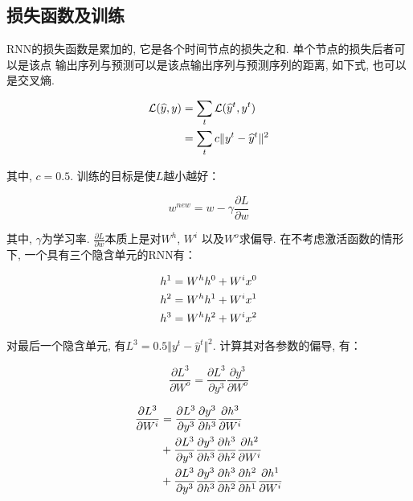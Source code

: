 \documentclass[UTF8, twocolumn]{ctexart}
\begin{document}
\subsection{损失函数及训练}
RNN的损失函数是累加的, 它是各个时间节点的损失之和. 单个节点的损失后者可以是该点
输出序列与预测可以是该点输出序列与预测序列的距离, 如下式, 也可以是交叉熵. 


\begin{align}
\mathcal{L}(\widehat{y},y)\notag &= \sum_t \mathcal{L}(\widehat{y}^t, y^t)\\
                                  &= \sum_t c \Vert y^t - \widehat{y}^t \Vert^2
\end{align}


其中, $c=0.5$. 训练的目标是使$L$越小越好：

\begin{equation}
w^{new} = w - \gamma \frac{\partial L}{\partial w}
\end{equation}

其中, $\gamma$为学习率. $\frac{\partial L}{\partial w}$本质上是对$W^h$, $W^i$
以及$W^o$求偏导. 在不考虑激活函数的情形下, 一个具有三个隐含单元的RNN有：

\begin{align}
h^1 = W^h h^0 + W^i x^0\notag \\
h^2 = W^h h^1 + W^i x^1\notag \\
h^3 = W^h h^2 + W^i x^2
\end{align}


对最后一个隐含单元, 有$L^3 = 0.5 \Vert y^t - \widehat{y}^t \Vert^2$. 
计算其对各参数的偏导, 有：

\begin{equation}
\frac{\partial L^3}{\partial W^o} = \frac{\partial L^3}{\partial y^3}
\frac{\partial y^3}{\partial W^o}
\end{equation}

\begin{align}
\frac{\partial L^3}{\partial W^i} & = \frac{\partial L^3}{\partial y^3}
\frac{\partial y^3}{\partial h^3}\frac{\partial h^3}{\partial W^i}
\notag \\ & + \frac{\partial L^3}{\partial y^3}
\frac{\partial y^3}{\partial h^3}\frac{\partial h^3}{\partial h^2}
\frac{\partial h^2}{\partial W^i}
\notag \\ & + \frac{\partial L^3}{\partial y^3}
\frac{\partial y^3}{\partial h^3}\frac{\partial h^3}{\partial h^2}
\frac{\partial h^2}{\partial h^1}\frac{\partial h^1}{\partial W^i}
\end{align}
\end{document}
